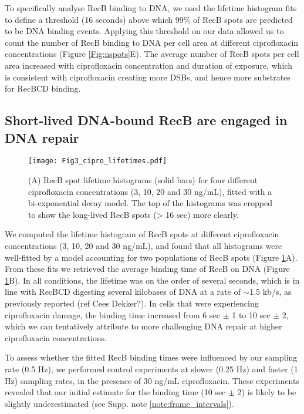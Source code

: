 To specifically analyse RecB binding to DNA, we used the lifetime histogram fits to define a threshold (16 seconds) above which 99\% of RecB spots are predicted to be DNA binding events. Applying this threshold on our data allowed us to count the number of RecB binding to DNA per cell area at different ciprofloxacin concentrations (Figure \ref{Fig:nspots}E). The average number of RecB spots per cell area increased with ciprofloxacin concentration and duration of exposure, which is consistent with ciprofloxacin creating more DSBs, and hence more substrates for RecBCD binding.


\subsection*{Short-lived DNA-bound RecB are engaged in DNA repair}

\begin{figure}[htbp]
\centering
\texttt{[image: Fig3\_cipro\_lifetimes.pdf]}
\caption{(A) RecB spot lifetime histograms (solid bars) for four different ciprofloxacin concentrations (3, 10, 20 and 30 ng/mL), fitted with a bi-exponential decay model. The top of the histograms was cropped to show the long-lived RecB spots (> 16 sec) more clearly.}
\label{Fig:lifetimes}
\end{figure}


We computed the lifetime histogram of RecB spots at different ciprofloxacin concentrations (3, 10, 20 and 30 ng/mL), and found that all histograms were well-fitted by a model accounting for two populations of RecB spots (Figure \ref{Fig:lifetimes}A). From these fits we retrieved the average binding time of RecB on DNA (Figure \ref{Fig:lifetimes}B). In all conditions, the lifetime was on the order of several seconds, which is in line with RecBCD digesting several kilobases of DNA at a rate of $\sim$1.5 kb/s, as previously reported (ref Cees Dekker?\cite{}). In cells that were experiencing ciprofloxacin damage, the binding time increased from 6 sec $\pm$ 1 to 10 sec $\pm$ 2, which we can tentatively attribute to more challenging DNA repair at higher ciprofloxacin concentrations.

To assess whether the fitted RecB binding times were influenced by our sampling rate (0.5 Hz), we performed control experiments at slower (0.25 Hz) and faster (1 Hz) sampling rates, in the presence of 30 ng/mL ciprofloxacin. These experiments revealed that our initial estimate for the binding time (10 sec $\pm$ 2) is likely to be slightly underestimated (see Supp. note \ref{note:frame_intervals}).




